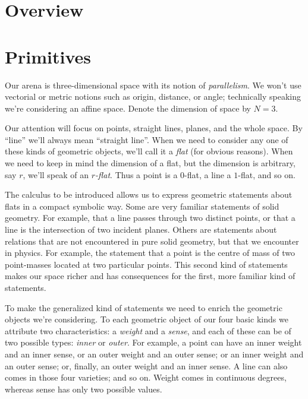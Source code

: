 \documentclass[\ifafour a4paper,12pt,\else a5paper,10pt,\fi%
onecolumn,oneside,article,%
british%
]{memoir}
\theoremstyle{remark}
\theoremstyle{innote}
\renewcommand*{\|}{\nonscript\,\vert\nonscript\;\mathopen{}}
\newcommand*{\yN}{N}
\begin{document}
\section{Overview}
\label{sec:overview}



\section{Primitives}
\label{sec:primitives}

Our arena is three-dimensional space with its notion of \emph{parallelism}.
We won't use vectorial or metric notions such as origin, distance, or
angle; technically speaking we're considering an affine space. Denote the
dimension of space by $\yN=3$.

Our attention will focus on points, straight lines, planes, and the whole
space. By \enquote{line} we'll always mean \enquote{straight line}. When we
need to consider any one of these kinds of geometric objects, we'll call it
a \emph{flat} (for obvious reasons). When we need to keep in mind the
dimension of a flat, but the dimension is arbitrary, say $r$, we'll speak
of an \emph{$r$-flat}. Thus a point is a $0$-flat, a line a $1$-flat, and
so on.

The calculus to be introduced allows us to express geometric statements
about flats in a compact symbolic way. Some are very familiar statements of
solid geometry. For example, that a line passes through two distinct
points, or that a line is the intersection of two incident planes. Others are
statements  about relations that are not encountered in pure solid
geometry, but that we encounter in physics. For example, the statement that
a point is the centre of mass of two point-masses located at two particular
points. This second kind of statements makes our space  richer and has
consequences for the first, more familiar kind of statements.

To make the generalized kind of statements we need to enrich the geometric
objects we're considering. To each geometric object of our four basic kinds
we attribute two characteristics: a \emph{weight} and a \emph{sense}, and
each of these can be of two possible types: \emph{inner} or \emph{outer}.
For example, a point can have an inner weight and an inner sense, or
an outer weight and an outer sense; or an inner weight and an outer
sense; or, finally, an outer weight and an inner sense. A line
can also comes in those four varieties; and so on. Weight comes in
continuous degrees, whereas sense has only two possible values.
\end{document}
